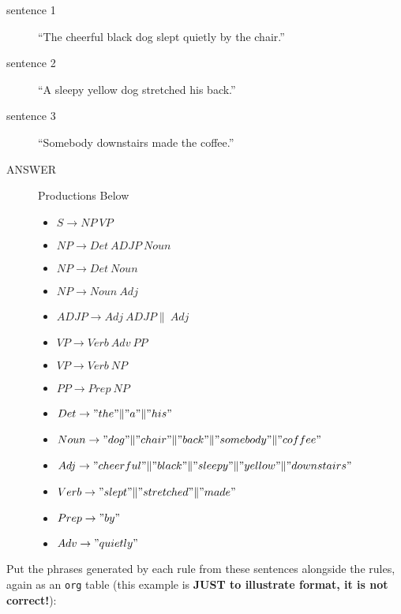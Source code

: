 \documentclass[11pt]{article}
\begin{document}
\begin{description}
\item[{sentence 1}] ``The cheerful black dog slept quietly by the chair.''
\item[{sentence 2}] ``A sleepy yellow dog stretched his back.''
\item[{sentence 3}] ``Somebody downstairs made the coffee.''
\item[{ANSWER}] Productions Below
\begin{itemize}
\item \(S \rightarrow NP\ VP\)
\item \(NP \rightarrow Det\ ADJP\ Noun\)
\item \(NP \rightarrow Det\ Noun\)
\item \(NP \rightarrow Noun\ Adj\)
\item \(ADJP \rightarrow Adj\ ADJP \|\ Adj\)
\item \(VP \rightarrow Verb\ Adv\ PP\)
\item \(VP \rightarrow Verb\ NP\)
\item \(PP \rightarrow Prep\ NP\)
\item \(Det \rightarrow "the" \| "a" \| "his"\)
\item \(Noun \rightarrow "dog" \| "chair" \| "back" \| "somebody" \| "coffee"\)
\item \(Adj \rightarrow "cheerful" \| "black" \| "sleepy" \| "yellow" \| "downstairs"\)
\item \(Verb \rightarrow "slept" \| "stretched" \| "made"\)
\item \(Prep \rightarrow "by"\)
\item \(Adv \rightarrow "quietly"\)
\end{itemize}
\end{description}

Put the phrases generated by each rule from these sentences alongside the
rules, again as an \texttt{org} table (this example is \textbf{JUST to illustrate format,
it is not correct!}):
\end{document}
